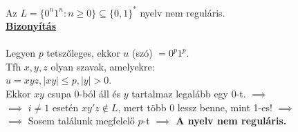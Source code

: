 \documentclass{beamer}
\newcommand{\msmallskip}{\vspace{0.3em}}
\newcommand{\mmedskip}{\vspace{0.5em}}
\newcommand{\mbigskip}{\vspace{1em}}
\begin{document}
\begin{frame}
\begin{tcolorbox}[title={Tétel: Példa nemreguláris nyelvre}]
Az $L = \{0^n1^n : n \geq 0\} \subseteq \{0, 1\}^*$ nyelv nem reguláris.\\
\tcblower
\msmallskip
\underline{\textbf{Bizonyítás}}\\
\mmedskip
\\
Legyen $p$  tetszőleges, ekkor $u$ (szó) $ = 0^p1^p$.\\
Tfh $x, y, z$ olyan szavak, amelyekre:\\
$u = xyz, |xy| \leq p, |y| > 0$.\\
\mbigskip
Ekkor $xy$ csupa 0-ból áll és $y$ tartalmaz legalább egy 0-t. $\implies$\\
$\implies$ $i \neq 1$ esetén $xy'z \notin L$, mert több 0 lessz benne, mint 1-es! $\implies$\\
$\implies$ Sosem találunk megfelelő $p$-t $\implies$ \textbf{A nyelv nem reguláris.}\\
\end{tcolorbox}

\end{frame}
\end{document}
